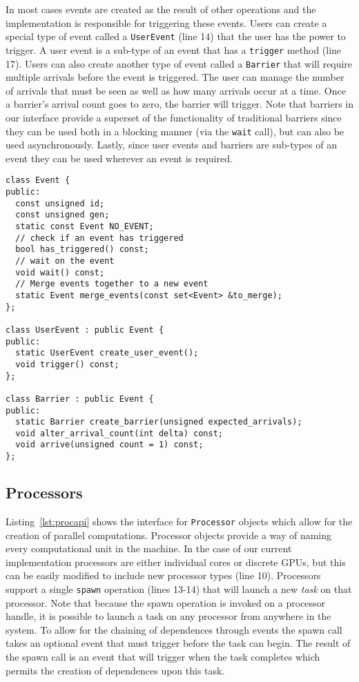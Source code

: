In most cases events are created as the result of other
operations and the implementation is responsible for triggering these events.  Users 
can create a special type of event called a {\tt UserEvent} (line 14) that the
user has the power to trigger.  A user event is a sub-type of an event
that has a {\tt trigger} method (line 17).  Users can also create another
type of event called a {\tt Barrier} that will require multiple arrivals before
the event is triggered.  The user can manage the number of arrivals that must
be seen as well as how many arrivals occur at a time.  Once a barrier's arrival
count goes to zero, the barrier will trigger.  Note that barriers in our interface
provide a superset of the functionality of traditional barriers since they can
be used both in a blocking manner (via the {\tt wait} call), but can also be used
asynchronously.  Lastly, since user events and barriers are sub-types of 
an event they can be used wherever an event is required.

\begin{lstlisting}[float={t},label={lst:eventapi},caption={Event Interface.}]
class Event {
public:
  const unsigned id;
  const unsigned gen;
  static const Event NO_EVENT;
  // check if an event has triggered
  bool has_triggered() const;
  // wait on the event
  void wait() const;
  // Merge events together to a new event
  static Event merge_events(const set<Event> &to_merge);
};

class UserEvent : public Event {
public:
  static UserEvent create_user_event();
  void trigger() const;
};

class Barrier : public Event {
public:
  static Barrier create_barrier(unsigned expected_arrivals);
  void alter_arrival_count(int delta) const;
  void arrive(unsigned count = 1) const;
};
\end{lstlisting}

\subsection{Processors}
\label{subsec:procs}
Listing~\ref{lst:procapi} shows the interface for {\tt Processor} objects which allow for
the creation of parallel computations.  Processor objects provide a way of naming 
every computational unit in the machine.  In the case of our current implementation 
processors are either individual cores or discrete GPUs, but this can be easily modified 
to include new processor types (line 10).   Processors support a single {\tt spawn}
operation (lines 13-14) that will launch a new {\em task} on that processor.
Note that because the spawn operation
is invoked on a processor handle, it is possible to launch a task on any
processor from anywhere in the system.  To allow for the chaining of dependences
through events the spawn call takes an 
optional event that must trigger before the task can begin.  
The result of the spawn call is an event that will trigger when the task completes
which permits the creation of dependences upon this task.

